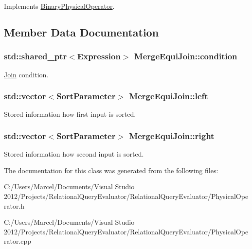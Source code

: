 Implements \hyperlink{class_binary_physical_operator_a29ec622920006cb5428bf2c259918347}{Binary\+Physical\+Operator}.



\subsection{Member Data Documentation}
\hypertarget{class_merge_equi_join_ac334a1377a90c2876f9a5fad38d1836e}{
\subsubsection[{condition}]{\setlength{\rightskip}{0pt plus 5cm}std\+::shared\+\_\+ptr$<${\bf Expression}$>$ Merge\+Equi\+Join\+::condition}}\label{class_merge_equi_join_ac334a1377a90c2876f9a5fad38d1836e}
\hyperlink{class_join}{Join} condition. \hypertarget{class_merge_equi_join_a10a2e1737a5d7c2e554f55b0e0863d04}{
\subsubsection[{left}]{\setlength{\rightskip}{0pt plus 5cm}std\+::vector$<${\bf Sort\+Parameter}$>$ Merge\+Equi\+Join\+::left}}\label{class_merge_equi_join_a10a2e1737a5d7c2e554f55b0e0863d04}
Stored information how first input is sorted. \hypertarget{class_merge_equi_join_a0d32b50a198ce479cae3bbdc52b9766a}{
\subsubsection[{right}]{\setlength{\rightskip}{0pt plus 5cm}std\+::vector$<${\bf Sort\+Parameter}$>$ Merge\+Equi\+Join\+::right}}\label{class_merge_equi_join_a0d32b50a198ce479cae3bbdc52b9766a}
Stored information how second input is sorted. 

The documentation for this class was generated from the following files\+:\begin{DoxyCompactItemize}
\item 
C\+:/\+Users/\+Marcel/\+Documents/\+Visual Studio 2012/\+Projects/\+Relational\+Query\+Evaluator/\+Relational\+Query\+Evaluator/Physical\+Operator.\+h\item 
C\+:/\+Users/\+Marcel/\+Documents/\+Visual Studio 2012/\+Projects/\+Relational\+Query\+Evaluator/\+Relational\+Query\+Evaluator/Physical\+Operator.\+cpp\end{DoxyCompactItemize}
